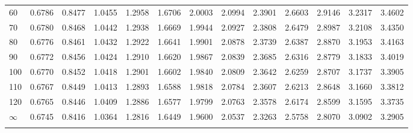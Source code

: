 {\begin{tabular}{m{6pt}|m{24pt}*{11}{m{24pt}}}
 60 & 0.6786 & 0.8477 & 1.0455 & 1.2958 & 1.6706 & 2.0003 & 2.0994 & 2.3901 & 2.6603 & 2.9146 & 3.2317 & 3.4602 \\[1pt] \arrayrulecolor{light-gray}\hline\arrayrulecolor{black}  
 70 & 0.6780 & 0.8468 & 1.0442 & 1.2938 & 1.6669 & 1.9944 & 2.0927 & 2.3808 & 2.6479 & 2.8987 & 3.2108 & 3.4350 \\[1pt] \arrayrulecolor{light-gray}\hline\arrayrulecolor{black}  
 80 & 0.6776 & 0.8461 & 1.0432 & 1.2922 & 1.6641 & 1.9901 & 2.0878 & 2.3739 & 2.6387 & 2.8870 & 3.1953 & 3.4163 \\[1pt] \arrayrulecolor{light-gray}\hline\arrayrulecolor{black}  
 90 & 0.6772 & 0.8456 & 1.0424 & 1.2910 & 1.6620 & 1.9867 & 2.0839 & 2.3685 & 2.6316 & 2.8779 & 3.1833 & 3.4019 \\[1pt] \arrayrulecolor{light-gray}\hline\arrayrulecolor{black}  
100 & 0.6770 & 0.8452 & 1.0418 & 1.2901 & 1.6602 & 1.9840 & 2.0809 & 2.3642 & 2.6259 & 2.8707 & 3.1737 & 3.3905 \\[1pt] \arrayrulecolor{light-gray}\hline\arrayrulecolor{black}  
110 & 0.6767 & 0.8449 & 1.0413 & 1.2893 & 1.6588 & 1.9818 & 2.0784 & 2.3607 & 2.6213 & 2.8648 & 3.1660 & 3.3812 \\[1pt] \arrayrulecolor{light-gray}\hline\arrayrulecolor{black}  
120 & 0.6765 & 0.8446 & 1.0409 & 1.2886 & 1.6577 & 1.9799 & 2.0763 & 2.3578 & 2.6174 & 2.8599 & 3.1595 & 3.3735 \\[1pt] \arrayrulecolor{light-gray}\hline\arrayrulecolor{black}  
$\infty$  & 0.6745 & 0.8416 & 1.0364 & 1.2816 & 1.6449 & 1.9600 & 2.0537 & 2.3263 & 2.5758 & 2.8070 & 3.0902 & 3.2905 \\[5pt] \arrayrulecolor{light-gray}\hline\arrayrulecolor{black}  
\end{tabular}
}

